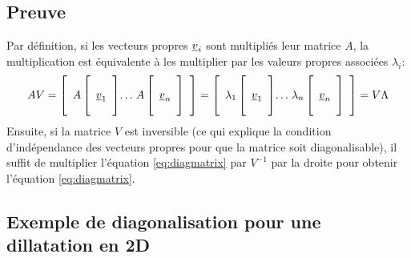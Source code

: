 \subsection{Preuve}
\label{sec:preuvediag}

Par définition, si les vecteurs propres $\underline{v}_i$ sont multipliés leur matrice $A$, la multiplication est équivalente à les multiplier par les valeurs propres associées $\lambda_i$:
%
\begin{align}
A V = 
\left[ \begin{array}{c@{}c@{}c}  
A \left[   \begin{array}{c}  \\ \underline{v}_1 \\ \\ \end{array} \right] &  \ldots & \; A \left[  \begin{array}{c} \\ \underline{v}_n \\ \\ \end{array} \right]
\end{array} \right]
= 
\left[ \begin{array}{c@{}c@{}c}  
\lambda_1 \left[   \begin{array}{c}  \\ \underline{v}_1 \\ \\ \end{array} \right] &  \ldots & \;\lambda_n \left[  \begin{array}{c} \\  \underline{v}_n \\ \\ \end{array} \right]
\end{array} \right]
= V \Lambda
\end{align}
\label{eq:diagproof}
Ensuite, si la matrice $V$ est inversible (ce qui explique la condition d'indépendance des vecteurs propres pour que la matrice soit diagonalisable), il suffit de multiplier l'équation \eqref{eq:diagmatrix} par $V^{-1}$ par la droite pour obtenir l'équation \eqref{eq:diagmatrix}. 




\subsection{Exemple de diagonalisation pour une dillatation en 2D}
\label{sec:ExempleDeDiagonalisationPourUneDillatationEn2D}

